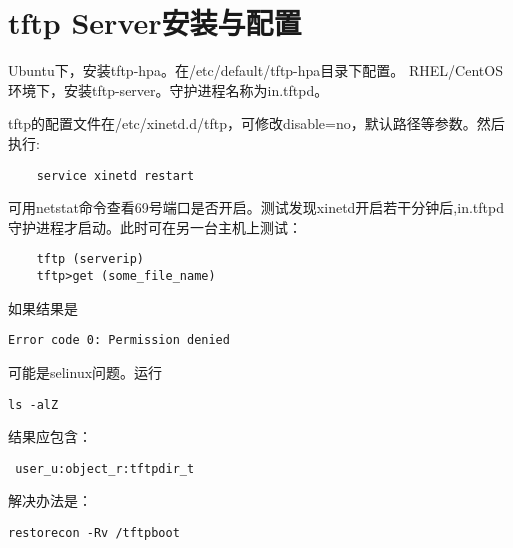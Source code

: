 \section{tftp Server安装与配置}

Ubuntu下，安装tftp-hpa。在/etc/default/tftp-hpa目录下配置。
RHEL/CentOS环境下，安装tftp-server。守护进程名称为in.tftpd。

tftp的配置文件在/etc/xinetd.d/tftp，可修改disable=no，默认路径等参数。然后执行:
\begin{lstlisting}
    service xinetd restart
\end{lstlisting}

可用netstat命令查看69号端口是否开启。测试发现xinetd开启若干分钟后,in.tftpd守护进程才启动。此时可在另一台主机上测试：

\begin{lstlisting}
    tftp (serverip)
    tftp>get (some_file_name)
\end{lstlisting}

如果结果是
\begin{lstlisting}
Error code 0: Permission denied
\end{lstlisting}
可能是selinux问题。运行
\begin{lstlisting}
ls -alZ
\end{lstlisting}
结果应包含：
\begin{lstlisting}
 user_u:object_r:tftpdir_t
\end{lstlisting}

解决办法是：
\begin{lstlisting}
restorecon -Rv /tftpboot 
\end{lstlisting}

